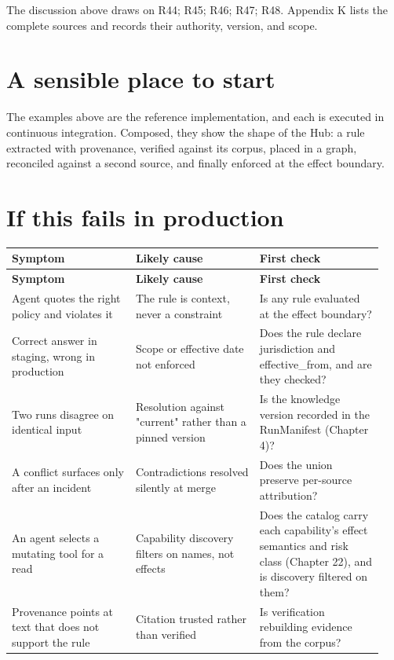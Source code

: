 The discussion above draws on R44; R45; R46; R47; R48. Appendix K lists the complete sources and records their authority, version, and scope.\par

\section{A sensible place to start}

The examples above are the reference implementation, and each is executed in continuous integration. Composed, they show the shape of the Hub: a rule extracted with provenance, verified against its corpus, placed in a graph, reconciled against a second source, and finally enforced at the effect boundary.\par

\section{If this fails in production}

\BookTableStart
\small
\begin{longtable}{@{}Y{0.3133\linewidth}Y{0.3133\linewidth}Y{0.3133\linewidth}@{}}
\color{white}\bfseries Symptom & \color{white}\bfseries Likely cause & \color{white}\bfseries First check \\
\endfirsthead
{}
\color{white}\bfseries Symptom & \color{white}\bfseries Likely cause & \color{white}\bfseries First check \\
\endhead
Agent quotes the right policy and violates it & The rule is context, never a constraint & Is any rule evaluated at the effect boundary? \\
Correct answer in staging, wrong in production & Scope or effective date not enforced & Does the rule declare jurisdiction and effective\_from, and are they checked? \\
Two runs disagree on identical input & Resolution against "current" rather than a pinned version & Is the knowledge version recorded in the RunManifest (Chapter 4)? \\
A conflict surfaces only after an incident & Contradictions resolved silently at merge & Does the union preserve per-source attribution? \\
An agent selects a mutating tool for a read & Capability discovery filters on names, not effects & Does the catalog carry each capability's effect semantics and risk class (Chapter 22), and is discovery filtered on them? \\
Provenance points at text that does not support the rule & Citation trusted rather than verified & Is verification rebuilding evidence from the corpus? \\
\end{longtable}
\BookTableEnd

